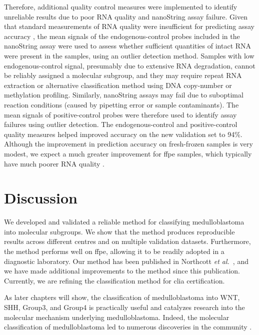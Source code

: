 Therefore, additional quality control measures were implemented to identify unreliable results due to poor RNA quality and nanoString assay failure. Given that standard measurements of RNA quality were insufficient for predicting assay accuracy , the mean signals of the endogenous-control probes included in the nanoString assay were used to assess whether sufficient quantities of intact RNA were present in the samples, using an outlier detection method. Samples with low endogenous-control signal, presumably due to extensive RNA degradation, cannot be reliably assigned a molecular subgroup, and they may require repeat RNA extraction or alternative classification method using DNA copy-number or methylation profiling. Similarly, nanoString assays may fail due to suboptimal reaction conditions (caused by pipetting error or sample contaminants). The mean signals of positive-control probes were therefore used to identify assay failures using outlier detection. The endogenous-control and positive-control quality measures helped improved accuracy on the new validation set to 94\%. Although the improvement in prediction accuracy on fresh-frozen samples is very modest, we expect a much greater improvement for \gls{ffpe} samples, which typically have much poorer RNA quality .


\section{Discussion}

We developed and validated a reliable method for classifying medulloblastoma into molecular subgroups. We show that the method produces reproducible results across different centres and on multiple validation datasets. Furthermore, the method performs well on \gls{ffpe}, allowing it to be readily adopted in a diagnostic laboratory. Our method has been published in Northcott \emph{et al.}\ , and we have made additional improvements to the method since this publication. Currently, we are refining the classification method for \gls{clia} certification.

As later chapters will show, the classification of medulloblastoma into WNT, SHH, Group3, and Group4 is practically useful and catalyzes research into the molecular mechanism underlying medulloblastoma. Indeed, the molecular classification of medulloblastoma led to numerous discoveries in the community .


\clearpage
